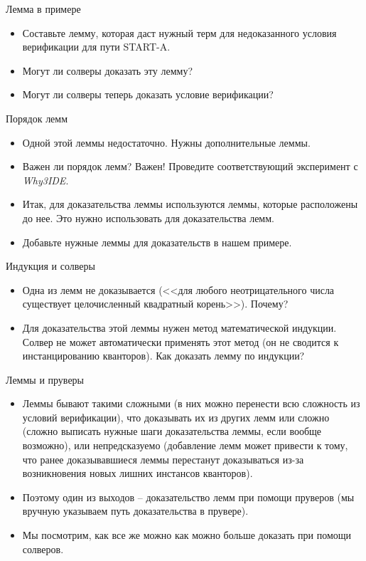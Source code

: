 \documentclass[hyperref={unicode=true}]{beamer}
\begin{document}
    \begin{frame}{Лемма в примере}
    \begin{itemize}
    \item
    Составьте лемму, которая даст нужный терм для недоказанного
    условия верификации для пути START-A.
    \item
    Могут ли солверы доказать эту лемму?
    \item
    Могут ли солверы теперь доказать условие верификации?
    \end{itemize}
    \end{frame}

    \begin{frame}{Порядок лемм}
    \begin{itemize}
    \item
    Одной этой леммы недостаточно. Нужны дополнительные леммы.
    \item
    Важен ли порядок лемм? Важен! Проведите соответствующий
    эксперимент с \textsl{Why3IDE}.
    \item
    Итак, для доказательства леммы используются леммы, которые
    расположены до нее. Это нужно использовать для доказательства лемм.
    \item
    Добавьте нужные леммы для доказательств в нашем примере.
    \end{itemize}
    \end{frame}

    \begin{frame}{Индукция и солверы}
    \begin{itemize}
    \item
    Одна из лемм не доказывается (<<для любого неотрицательного
            числа существует целочисленный квадратный корень>>). Почему?
    \item
    Для доказательства этой леммы нужен метод математической
    индукции. Солвер не может автоматически применять этот метод
    (он не сводится к инстанцированию кванторов). Как доказать лемму
    по индукции?
    \end{itemize}
    \end{frame}

    \begin{frame}{Леммы и пруверы}
    \begin{itemize}
    \item
    Леммы бывают такими сложными (в них можно перенести всю сложность
    из условий верификации), что доказывать их из других лемм или сложно
    (сложно выписать нужные шаги доказательства леммы, если вообще
    возможно), или непредсказуемо (добавление лемм может привести к тому,
    что ранее доказывавшиеся леммы перестанут доказываться из-за
    возникновения новых лишних инстансов кванторов).
    \item
    Поэтому один из выходов -- доказательство лемм при помощи пруверов
    (мы вручную указываем путь доказательства в прувере).
    \item
    Мы посмотрим, как все же можно как можно больше доказать при помощи
    солверов.
    \end{itemize}
    \end{frame}
\end{document}
